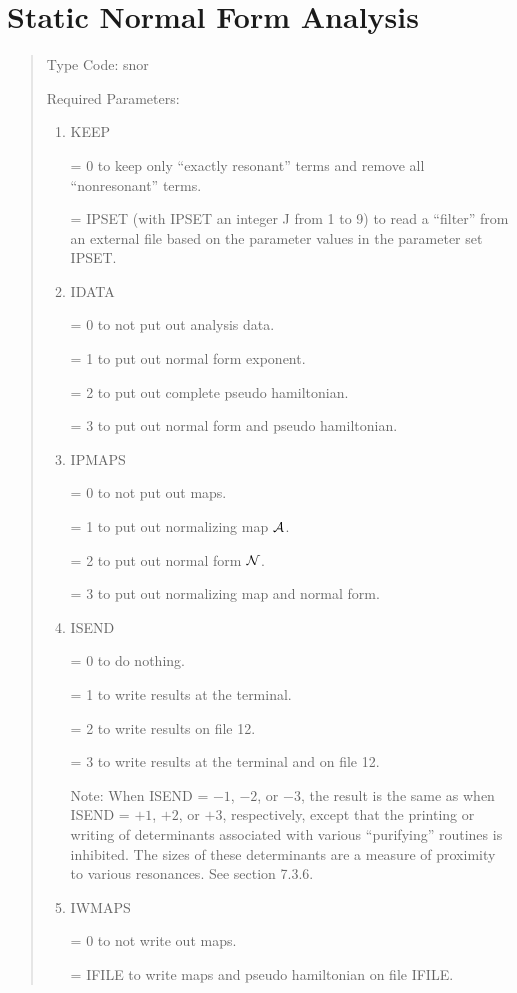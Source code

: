 \newpage
\section{Static Normal Form Analysis}
\begin{quotation}
\noindent     Type Code:  snor
\vspace{5mm}

\noindent Required Parameters:
\begin{enumerate}
      \item  KEEP

             = 0 to keep only ``exactly resonant'' terms and remove all
               ``nonresonant'' \hspace*{1em}terms.

             = IPSET (with IPSET an integer J from 1 to 9) to read a
               ``filter'' from an \hspace*{1em}external file based on the parameter values
               in the parameter set IPSET.

      \item  IDATA

             = 0 to not put out analysis data.

             = 1 to put out normal form exponent.

             = 2 to put out complete pseudo hamiltonian.

             = 3 to put out normal form and pseudo hamiltonian.

      \item  IPMAPS

             = 0 to not put out maps.

             = 1 to put out normalizing map ${\cal A}$.

             = 2 to put out normal form ${\cal N}$.

             = 3 to put out normalizing map and normal form.

      \item  ISEND

             = 0 to do nothing.

             = 1 to write results at the terminal.

             = 2 to write results on file 12.

             = 3 to write results at the terminal and on file 12.

             Note:  When ISEND = $-1$, $-2$, or $-3$, the result is the same as
             when ISEND = $+1$, $+2$, or $+3$, respectively, except that the
             printing or writing of determinants associated with various
             ``purifying'' routines is inhibited.  The sizes of these
             determinants are a measure of proximity to various resonances.  See section 7.3.6.


      \item  IWMAPS

             = 0 to not write out maps.

             = IFILE to write maps and pseudo hamiltonian on file IFILE.
\end{enumerate}
\end{quotation}
